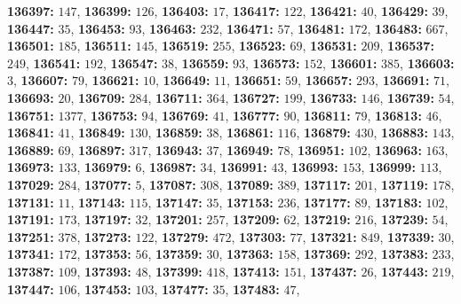 \textsf{\bfseries 136397:} $147$, \textsf{\bfseries 136399:} $126$, \textsf{\bfseries 136403:} $17$, \textsf{\bfseries 136417:} $122$, \textsf{\bfseries 136421:} $40$, \textsf{\bfseries 136429:} $39$, \textsf{\bfseries 136447:} $35$, \textsf{\bfseries 136453:} $93$, \textsf{\bfseries 136463:} $232$, \textsf{\bfseries 136471:} $57$, \textsf{\bfseries 136481:} $172$, \textsf{\bfseries 136483:} $667$, \textsf{\bfseries 136501:} $185$, \textsf{\bfseries 136511:} $145$, \textsf{\bfseries 136519:} $255$, \textsf{\bfseries 136523:} $69$, \textsf{\bfseries 136531:} $209$, \textsf{\bfseries 136537:} $249$, \textsf{\bfseries 136541:} $192$, \textsf{\bfseries 136547:} $38$, \textsf{\bfseries 136559:} $93$, \textsf{\bfseries 136573:} $152$, \textsf{\bfseries 136601:} $385$, \textsf{\bfseries 136603:} $3$, \textsf{\bfseries 136607:} $79$, \textsf{\bfseries 136621:} $10$, \textsf{\bfseries 136649:} $11$, \textsf{\bfseries 136651:} $59$, \textsf{\bfseries 136657:} $293$, \textsf{\bfseries 136691:} $71$, \textsf{\bfseries 136693:} $20$, \textsf{\bfseries 136709:} $284$, \textsf{\bfseries 136711:} $364$, \textsf{\bfseries 136727:} $199$, \textsf{\bfseries 136733:} $146$, \textsf{\bfseries 136739:} $54$, \textsf{\bfseries 136751:} $1377$, \textsf{\bfseries 136753:} $94$, \textsf{\bfseries 136769:} $41$, \textsf{\bfseries 136777:} $90$, \textsf{\bfseries 136811:} $79$, \textsf{\bfseries 136813:} $46$, \textsf{\bfseries 136841:} $41$, \textsf{\bfseries 136849:} $130$, \textsf{\bfseries 136859:} $38$, \textsf{\bfseries 136861:} $116$, \textsf{\bfseries 136879:} $430$, \textsf{\bfseries 136883:} $143$, \textsf{\bfseries 136889:} $69$, \textsf{\bfseries 136897:} $317$, \textsf{\bfseries 136943:} $37$, \textsf{\bfseries 136949:} $78$, \textsf{\bfseries 136951:} $102$, \textsf{\bfseries 136963:} $163$, \textsf{\bfseries 136973:} $133$, \textsf{\bfseries 136979:} $6$, \textsf{\bfseries 136987:} $34$, \textsf{\bfseries 136991:} $43$, \textsf{\bfseries 136993:} $153$, \textsf{\bfseries 136999:} $113$, \textsf{\bfseries 137029:} $284$, \textsf{\bfseries 137077:} $5$, \textsf{\bfseries 137087:} $308$, \textsf{\bfseries 137089:} $389$, \textsf{\bfseries 137117:} $201$, \textsf{\bfseries 137119:} $178$, \textsf{\bfseries 137131:} $11$, \textsf{\bfseries 137143:} $115$, \textsf{\bfseries 137147:} $35$, \textsf{\bfseries 137153:} $236$, \textsf{\bfseries 137177:} $89$, \textsf{\bfseries 137183:} $102$, \textsf{\bfseries 137191:} $173$, \textsf{\bfseries 137197:} $32$, \textsf{\bfseries 137201:} $257$, \textsf{\bfseries 137209:} $62$, \textsf{\bfseries 137219:} $216$, \textsf{\bfseries 137239:} $54$, \textsf{\bfseries 137251:} $378$, \textsf{\bfseries 137273:} $122$, \textsf{\bfseries 137279:} $472$, \textsf{\bfseries 137303:} $77$, \textsf{\bfseries 137321:} $849$, \textsf{\bfseries 137339:} $30$, \textsf{\bfseries 137341:} $172$, \textsf{\bfseries 137353:} $56$, \textsf{\bfseries 137359:} $30$, \textsf{\bfseries 137363:} $158$, \textsf{\bfseries 137369:} $292$, \textsf{\bfseries 137383:} $233$, \textsf{\bfseries 137387:} $109$, \textsf{\bfseries 137393:} $48$, \textsf{\bfseries 137399:} $418$, \textsf{\bfseries 137413:} $151$, \textsf{\bfseries 137437:} $26$, \textsf{\bfseries 137443:} $219$, \textsf{\bfseries 137447:} $106$, \textsf{\bfseries 137453:} $103$, \textsf{\bfseries 137477:} $35$, \textsf{\bfseries 137483:} $47$, 
